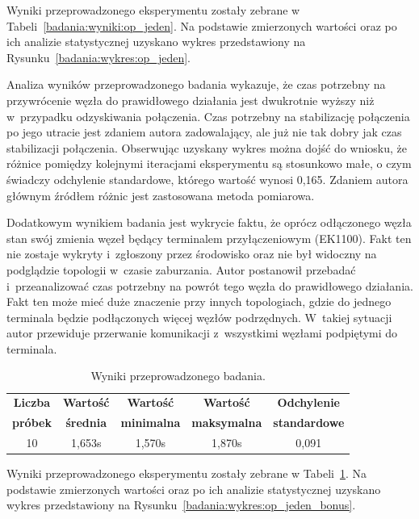 \noindent Wyniki przeprowadzonego eksperymentu zostały zebrane w Tabeli~\ref{badania:wyniki:op_jeden}. Na podstawie zmierzonych wartości oraz po ich analizie statystycznej uzyskano wykres przedstawiony na Rysunku~\ref{badania:wykres:op_jeden}.


Analiza wyników przeprowadzonego badania wykazuje, że czas potrzebny na przywrócenie węzła do prawidłowego działania jest dwukrotnie wyższy niż w~przypadku odzyskiwania połączenia. Czas potrzebny na stabilizację połączenia po jego utracie jest zdaniem autora zadowalający, ale już nie tak dobry jak czas stabilizacji połączenia. Obserwując uzyskany wykres można dojść do wniosku, że różnice pomiędzy kolejnymi iteracjami eksperymentu są stosunkowo małe, o czym świadczy odchylenie standardowe, którego wartość wynosi 0,165. Zdaniem autora głównym źródłem różnic jest zastosowana metoda pomiarowa.

Dodatkowym wynikiem badania jest wykrycie faktu, że oprócz odłączonego węzła stan swój zmienia węzeł będący terminalem przyłączeniowym (EK1100). Fakt ten nie zostaje wykryty i~zgłoszony przez środowisko oraz nie był widoczny na podglądzie topologii w~czasie zaburzania. Autor postanowił przebadać i~przeanalizować czas potrzebny na powrót tego węzła do prawidłowego działania. Fakt ten może mieć duże znaczenie przy innych topologiach, gdzie do jednego terminala będzie podłączonych więcej węzłów podrzędnych. W~takiej sytuacji autor przewiduje przerwanie komunikacji z~wszystkimi węzłami podpiętymi do terminala.

\begin{table}[!htb]
\begin{center}
\begin{tabular}{| c | c | c | c | c |}\hline
\textbf{Liczba} & \textbf{Wartość} & \textbf{Wartość} & \textbf{Wartość} & \textbf{Odchylenie} \\
\textbf{próbek} & \textbf{średnia} & \textbf{minimalna} & \textbf{maksymalna} & \textbf{standardowe} \\\hline\hline
10 & 1,653s & 1,570s & 1,870s & 0,091\\\hline
\end{tabular}
\end{center}
\vspace*{-6mm}
  \caption{Wyniki przeprowadzonego badania.}
	\label{badania:wyniki:op_jeden_bonus}
\end{table}

\noindent Wyniki przeprowadzonego eksperymentu zostały zebrane w Tabeli~\ref{badania:wyniki:op_jeden_bonus}. Na podstawie zmierzonych wartości oraz po ich analizie statystycznej uzyskano wykres przedstawiony na Rysunku~\ref{badania:wykres:op_jeden_bonus}.


